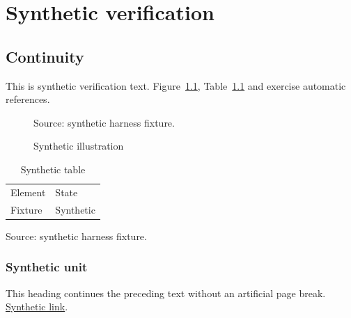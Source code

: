 \documentclass[12pt,oneside,a4paper]{memoir}
\begin{document}
\tableofcontents*
\listoffigures*
\listoftables*
\chapter{Synthetic verification}
\section{Continuity}
This is synthetic verification text. Figure~\ref{fig:fixture},
Table~\ref{tab:fixture} and \cite{fixture} exercise automatic references.
\begin{figure}[htbp]
\caption{Synthetic illustration}\label{fig:fixture}
\centering\fbox{\rule{0pt}{15mm}\rule{40mm}{0pt}}
\par\small Source: synthetic harness fixture.
\end{figure}
\begin{table}[htbp]
\caption{Synthetic table}\label{tab:fixture}
\centering\begin{tabular}{ll}Element & State\\ Fixture & Synthetic\end{tabular}
\par\small Source: synthetic harness fixture.
\end{table}
\subsection{Synthetic unit}
This heading continues the preceding text without an artificial page break.
\href{https://example.org/fixture}{Synthetic link}.
\printbibliography
\end{document}
